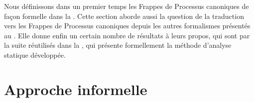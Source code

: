 Nous définissons dans un premier temps les Frappes de Processus canoniques
de façon formelle dans la .
Cette section aborde aussi la question de la traduction vers les Frappes de Processus canoniques
depuis les autres formalismes présentés au .
Elle donne enfin un certain nombre de résultats à leurs propos,
qui sont par la suite réutilisés dans la ,
qui présente formellement la méthode d'analyse statique développée.




\section{Approche informelle}
\TODO









